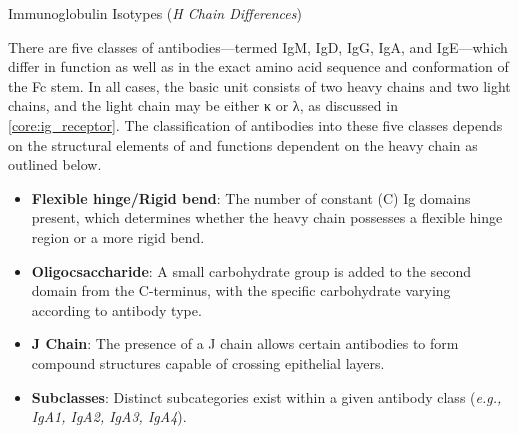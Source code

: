     \begin{core}[label=core:isotype]{Immunoglobulin Isotypes (\textit{H Chain Differences})}

      There are five classes of antibodies---termed IgM, IgD, IgG, IgA, and IgE---which differ in function as well as in the exact amino acid sequence and conformation of the Fc stem. In all cases, the basic unit consists of two heavy chains and two light chains, and the light chain may be either κ or λ, as discussed in \autoref{core:ig_receptor}. The classification of antibodies into these five classes depends on the structural elements of and functions dependent on the heavy chain as outlined below.

      \begin{itemize}

        \item \textbf{Flexible hinge/Rigid bend}: The number of constant (C) Ig domains present, which determines whether the heavy chain possesses a flexible hinge region or a more rigid bend.

        \item \textbf{Oligocsaccharide}: A small carbohydrate group is added to the second domain from the C-terminus, with the specific carbohydrate varying according to antibody type.

        \item \textbf{J Chain}: The presence of a J chain allows certain antibodies to form compound structures capable of crossing epithelial layers.

        \item \textbf{Subclasses}: Distinct subcategories exist within a given antibody class (\textit{e.g., IgA1, IgA2, IgA3, IgA4}).

      \end{itemize}


\end{core}
